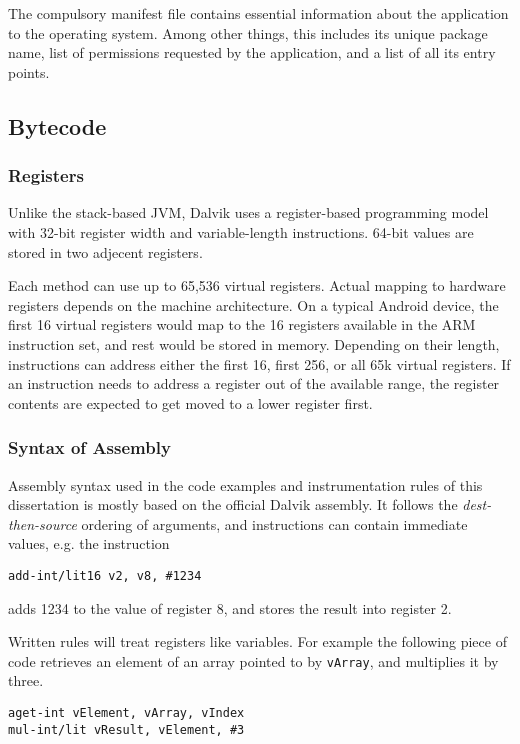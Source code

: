 \documentclass[12pt,twoside,notitlepage]{report}
\begin{document}
The compulsory manifest file contains essential information about the application to the operating system. Among other things, this includes its unique package name, list of permissions requested by the application, and a list of all its entry points.

\subsection{Bytecode}

\subsubsection{Registers}

Unlike the stack-based JVM, Dalvik uses a register-based programming model with 32-bit register width and variable-length instructions. 64-bit values are stored in two adjecent registers.

Each method can use up to 65,536 virtual registers. Actual mapping to hardware registers depends on the machine architecture. On a typical Android device, the first 16 virtual registers would map to the 16 registers available in the ARM instruction set, and rest would be stored in memory. Depending on their length, instructions can address either the first 16, first 256, or all 65k virtual registers. If an instruction needs to address a register out of the available range, the register contents are expected to get moved to a lower register first.

\subsubsection{Syntax of Assembly}
Assembly syntax used in the code examples and instrumentation rules of this dissertation is mostly based on the official Dalvik assembly. It follows the \textit{dest-then-source} ordering of arguments, and instructions can contain immediate values, e.g. the instruction
\begin{center}
\verb$add-int/lit16 v2, v8, #1234$
\end{center}
adds 1234 to the value of register 8, and stores the result into register 2. 

Written rules will treat registers like variables. For example the following piece of code retrieves an element of an array pointed to by \verb$vArray$, and multiplies it by three.
\begin{center}
\verb$aget-int vElement, vArray, vIndex$ \\
\verb$mul-int/lit vResult, vElement, #3$
\end{center}
\end{document}
